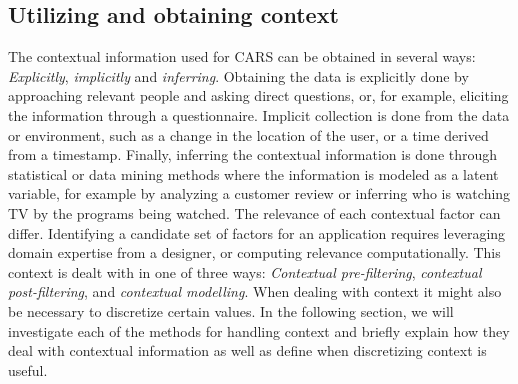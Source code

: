 \subsection{Utilizing and obtaining context}\label{subsec:utilizingandobtainingcontext}
The contextual information used for CARS can be obtained in several ways: \textit{Explicitly}, \textit{implicitly} and \textit{inferring}\cite{RecommenderHandbook2015}.
Obtaining the data is explicitly done by approaching relevant people and asking direct questions, or, for example, eliciting the information through a questionnaire.
Implicit collection is done from the data or environment, such as a change in the location of the user, or a time derived from a timestamp.
Finally, inferring the contextual information is done through statistical or data mining methods where the information is modeled as a latent variable, for example by analyzing a customer review or inferring who is watching TV by the programs being watched.
The relevance of each contextual factor can differ.
Identifying a candidate set of factors for an application requires leveraging domain expertise from a designer, or computing relevance computationally.
This context is dealt with in one of three ways\cite{Adomavicius2011}: \textit{Contextual pre-filtering}, \textit{contextual post-filtering}, and \textit{contextual modelling}.
When dealing with context it might also be necessary to discretize certain values.
In the following section, we will investigate each of the methods for handling context and briefly explain how they deal with contextual information as well as define when discretizing context is useful.

